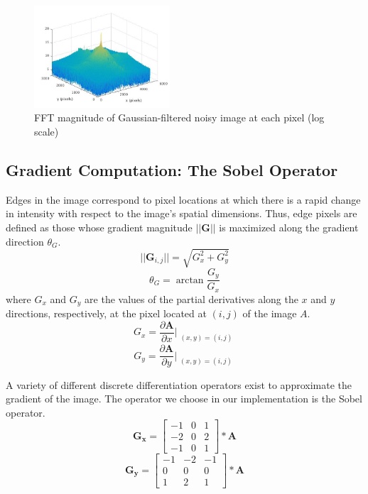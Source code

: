 \documentclass[journal]{IEEEtran}
\begin{document}
\begin{figure}[h]
	\centering
	\includegraphics[width=0.45\textwidth]{fft_filtered_noisy_image.jpg}
	\caption{FFT magnitude of Gaussian-filtered noisy image at each pixel (log scale)}
    \label{filtered-noisy-image-fft}
\end{figure}

\subsection{Gradient Computation: The Sobel Operator}
Edges in the image correspond to pixel locations at which there is a rapid change in intensity with respect to the image's spatial dimensions. Thus, edge pixels are defined as those whose gradient magnitude $||\boldsymbol{G}||$ is maximized along the gradient direction $\theta_G$.
\begin{equation}
	\label{gradient-magnitude}
	||\boldsymbol{G}_{i,j}|| = \sqrt{G_x^2 + G_y^2}
\end{equation}
\begin{equation}
	\label{gradient-angle}
	\theta_G = \arctan{\frac{G_y}{G_x}}
\end{equation}
where $G_x$ and $G_y$ are the values of the partial derivatives along the $x$ and $y$ directions, respectively, at the pixel located at $(i, j)$ of the image $A$.
$$G_x = \frac{\partial \boldsymbol{A}}{\partial x}\Bigr|_{\substack{(x, y) = (i, j)}}$$
$$G_y = \frac{\partial \boldsymbol{A}}{\partial y}\Bigr|_{\substack{(x, y) = (i, j)}}$$
\par A variety of different discrete differentiation operators exist to approximate the gradient of the image. The operator we choose in our implementation is the Sobel operator.
\[
\boldsymbol{G_x} =
\begin{bmatrix}
	-1 & 0 & 1 \\
	-2 & 0 & 2 \\
	-1 & 0 & 1
\end{bmatrix} * \boldsymbol{A}
\]
\[
\boldsymbol{G_y} =
\begin{bmatrix}
	-1 & -2 & -1 \\
	0 & 0 & 0 \\
	1 & 2 & 1
\end{bmatrix} * \boldsymbol{A}
\]
\end{document}
